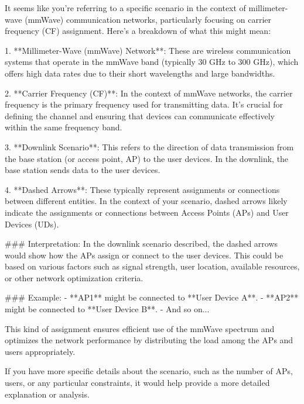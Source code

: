It seems like you're referring to a specific scenario in the context of millimeter-wave (mmWave) communication networks, particularly focusing on carrier frequency (CF) assignment. Here's a breakdown of what this might mean:

1. **Millimeter-Wave (mmWave) Network**: These are wireless communication systems that operate in the mmWave band (typically 30 GHz to 300 GHz), which offers high data rates due to their short wavelengths and large bandwidths.

2. **Carrier Frequency (CF)**: In the context of mmWave networks, the carrier frequency is the primary frequency used for transmitting data. It's crucial for defining the channel and ensuring that devices can communicate effectively within the same frequency band.

3. **Downlink Scenario**: This refers to the direction of data transmission from the base station (or access point, AP) to the user devices. In the downlink, the base station sends data to the user devices.

4. **Dashed Arrows**: These typically represent assignments or connections between different entities. In the context of your scenario, dashed arrows likely indicate the assignments or connections between Access Points (APs) and User Devices (UDs).

### Interpretation:
In the downlink scenario described, the dashed arrows would show how the APs assign or connect to the user devices. This could be based on various factors such as signal strength, user location, available resources, or other network optimization criteria.

### Example:
- **AP1** might be connected to **User Device A**.
- **AP2** might be connected to **User Device B**.
- And so on...

This kind of assignment ensures efficient use of the mmWave spectrum and optimizes the network performance by distributing the load among the APs and users appropriately.

If you have more specific details about the scenario, such as the number of APs, users, or any particular constraints, it would help provide a more detailed explanation or analysis.